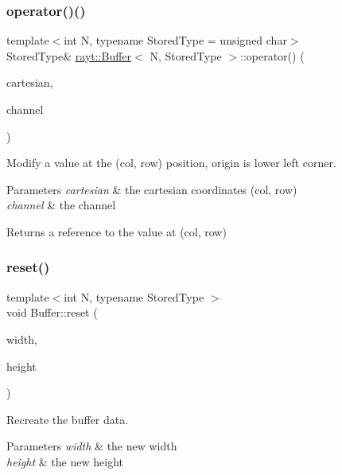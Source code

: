 \subsubsection{\texorpdfstring{operator()()}{operator()()}\hspace{0.1cm}{\footnotesize\ttfamily [4/4]}}
{\footnotesize\ttfamily template$<$int N, typename Stored\+Type = unsigned char$>$ \\
Stored\+Type\& \mbox{\hyperlink{classrayt_1_1_buffer}{rayt\+::\+Buffer}}$<$ N, Stored\+Type $>$\+::operator() (\begin{DoxyParamCaption}\item[{const Cartesian \&}]{cartesian,  }\item[{int}]{channel }\end{DoxyParamCaption})}



Modify a value at the (col, row) position, origin is lower left corner. 


\begin{DoxyParams}{Parameters}
{\em cartesian} & the cartesian coordinates (col, row) \\
\hline
{\em channel} & the channel \\
\hline
\end{DoxyParams}
\begin{DoxyReturn}{Returns}
a reference to the value at (col, row) 
\end{DoxyReturn}
\mbox{\label{classrayt_1_1_buffer_a674041ad7b285bf2418b75b7653ded36}} 
\subsubsection{\texorpdfstring{reset()}{reset()}}
{\footnotesize\ttfamily template$<$int N, typename Stored\+Type $>$ \\
void Buffer\+::reset (\begin{DoxyParamCaption}\item[{int}]{width,  }\item[{int}]{height }\end{DoxyParamCaption})}



Recreate the buffer data. 


\begin{DoxyParams}{Parameters}
{\em width} & the new width \\
\hline
{\em height} & the new height \\
\hline
\end{DoxyParams}
\mbox{\label{classrayt_1_1_buffer_ae41a09f4b386e06e73c0da5fa47e7535}} 
